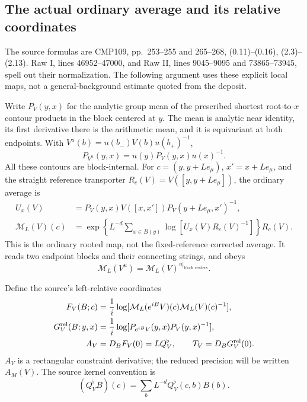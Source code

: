 \subsection{The actual ordinary average and its relative coordinates}
\label{pc-source-maps}

The source formulas are CMP109, pp.~253--255 and 265--268,
(0.11)--(0.16), (2.3)--(2.13). Raw I, lines 46952--47000, and
Raw II, lines 9045--9095 and 73865--73945, spell out their
normalization. The following argument uses these explicit local
maps, not a general-background estimate quoted from the deposit.

Write $P_V(y,x)$ for the analytic group mean of the prescribed
shortest root-to-$x$ contour products in the block centered at
$y$. The mean is analytic near identity, its first derivative
there is the arithmetic mean, and it is equivariant at both
endpoints. With $V^u(b)=u(b_-)V(b)u(b_+)^{-1}$,
\begin{equation}\label{pc-contour-gauge}
 P_{V^u}(y,x)=u(y)P_V(y,x)u(x)^{-1}.
\end{equation}
All these contours are block-internal. For
$c=(y,y+Le_\mu)$, $x'=x+Le_\mu$, and the straight reference
transporter $R_c(V)=V([y,y+Le_\mu])$, the ordinary average is
\begin{equation}\label{pc-ordinary-map}
 \begin{split}
 U_x(V)&=P_V(y,x)V([x,x'])P_V(y+Le_\mu,x')^{-1},\\
 \mathcal M_L(V)(c)&=
 \exp\left\{L^{-d}\sum_{x\in B(y)}
      \log[U_x(V)R_c(V)^{-1}]\right\}R_c(V).
 \end{split}
\end{equation}
This is the ordinary rooted map, not the fixed-reference
corrected average. It reads two endpoint blocks and their
connecting strings, and obeys
\[
 \mathcal M_L(V^u)=
 \mathcal M_L(V)^{u|_{\text{block centers}}}.
\]

Define the source's left-relative coordinates
\begin{equation}\label{pc-relative-maps}
 \begin{split}
 F_V(B;c)&=\frac1i\log[
  \mathcal M_L(e^{iB}V)(c)\mathcal M_L(V)(c)^{-1}],\\
 G^{\rm rel}_V(B;y,x)&=\frac1i\log[
  P_{e^{iB}V}(y,x)P_V(y,x)^{-1}],\\
 A_V&=D_BF_V(0)=LQ_V^\flat,\qquad
 T_V=D_BG^{\rm rel}_V(0).
 \end{split}
\end{equation}
$A_V$ is a rectangular constraint derivative; the reduced
precision will be written $A_M(V)$. The source kernel convention is
\begin{equation}\label{pc-kernel-convention}
 (Q_V^\flat B)(c)=\sum_b L^{-d}Q_V^\flat(c,b)B(b).
\end{equation}

